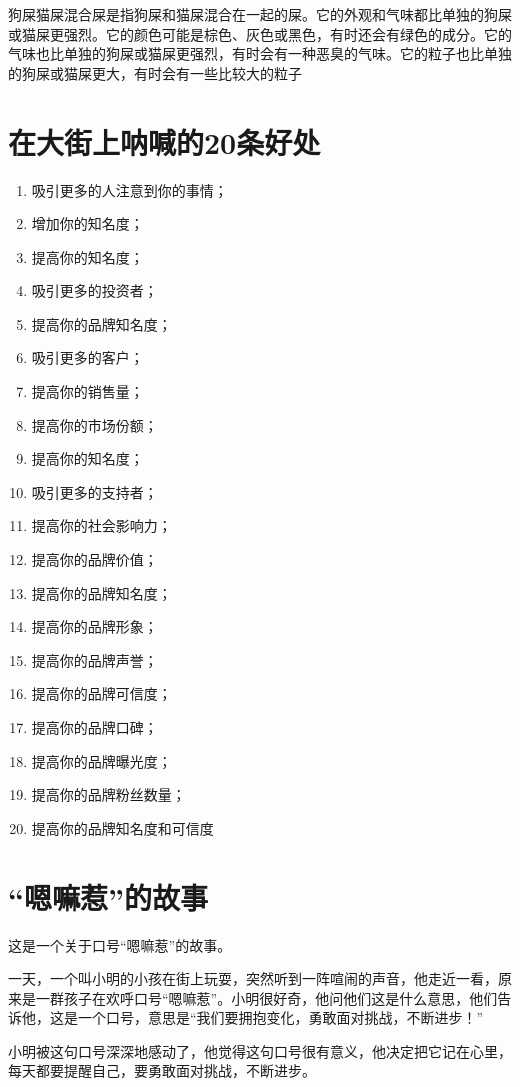 \documentclass[titlepage,oneside]{ctexbook}
\begin{document}
狗屎猫屎混合屎是指狗屎和猫屎混合在一起的屎。它的外观和气味都比单独的狗屎或猫屎更强烈。它的颜色可能是棕色、灰色或黑色，有时还会有绿色的成分。它的气味也比单独的狗屎或猫屎更强烈，有时会有一种恶臭的气味。它的粒子也比单独的狗屎或猫屎更大，有时会有一些比较大的粒子

\chapter{在大街上呐喊的20条好处}
\begin{enumerate}
    \item 吸引更多的人注意到你的事情；
    \item 增加你的知名度；
    \item 提高你的知名度；
    \item 吸引更多的投资者；
    \item 提高你的品牌知名度；
    \item 吸引更多的客户；
    \item 提高你的销售量；
    \item 提高你的市场份额；
    \item 提高你的知名度；
    \item 吸引更多的支持者；
    \item 提高你的社会影响力；
    \item 提高你的品牌价值；
    \item 提高你的品牌知名度；
    \item 提高你的品牌形象；
    \item 提高你的品牌声誉；
    \item 提高你的品牌可信度；
    \item 提高你的品牌口碑；
    \item 提高你的品牌曝光度；
    \item 提高你的品牌粉丝数量；
    \item 提高你的品牌知名度和可信度
\end{enumerate}

\chapter{“嗯嘛惹”的故事}
这是一个关于口号“嗯嘛惹”的故事。

一天，一个叫小明的小孩在街上玩耍，突然听到一阵喧闹的声音，他走近一看，原来是一群孩子在欢呼口号“嗯嘛惹”。小明很好奇，他问他们这是什么意思，他们告诉他，这是一个口号，意思是“我们要拥抱变化，勇敢面对挑战，不断进步！”

小明被这句口号深深地感动了，他觉得这句口号很有意义，他决定把它记在心里，每天都要提醒自己，要勇敢面对挑战，不断进步。
\end{document}
